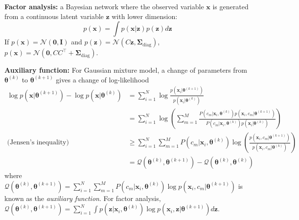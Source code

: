 \documentclass[12pt]{article}
\begin{document}
\textbf{Factor analysis:} a Bayesian network where the observed variable $\boldsymbol{x}$ is generated from a continuous latent variable $\boldsymbol{z}$ with lower dimension:
$$
p(\boldsymbol{x}) = \int p(\boldsymbol{x} | \boldsymbol{z}) p(\boldsymbol{z}) d\boldsymbol{z}
$$
If $p(\boldsymbol{x}) = \mathcal{N}(\mathbf{0}, \mathbf{I})$ and $p(\boldsymbol{z}) = \mathcal{N}(C\boldsymbol{z}, \boldsymbol{\Sigma}_\text{diag})$, $p(\boldsymbol{x}) = \mathcal{N}(\mathbf{0}, CC^\top + \boldsymbol{\Sigma}_\text{diag})$.

\textbf{Auxiliary function:} For Gaussian mixture model, a change of parameters from $\boldsymbol{\theta}^{(k)}$ to $\boldsymbol{\theta}^{(k+1)}$ gives a change of log-likelihood
\begin{align*}
\log p(\boldsymbol{x} | \boldsymbol{\theta}^{(k+1)}) - \log p(\boldsymbol{x} | \boldsymbol{\theta}^{(k)}) &= \sum_{i=1}^N \log \frac{p(\boldsymbol{x}_i | \boldsymbol{\theta}^{(k+1)})}{p(\boldsymbol{x}_i | \boldsymbol{\theta}^{(k)})} \\
&= \sum_{i=1}^N \log \left( \sum_{m=1}^M \frac{P(c_m | \boldsymbol{x}_i, \boldsymbol{\theta}^{(k)}) p(\boldsymbol{x}_i , c_m | \boldsymbol{\theta}^{(k+1)})}{P(c_m | \boldsymbol{x}_i, \boldsymbol{\theta}^{(k)})p(\boldsymbol{x}_i | \boldsymbol{\theta}^{(k)})}\right) \\
\text{(Jensen's inequality) } &\geq \sum_{i=1}^N \sum_{m=1}^M P(c_m | \boldsymbol{x}_i, \boldsymbol{\theta}^{(k)}) \log \left(\frac{p(\boldsymbol{x}_i , c_m | \boldsymbol{\theta}^{(k+1)})}{p(\boldsymbol{x}_i , c_m | \boldsymbol{\theta}^{(k)})}\right) \\
&= \mathcal{Q}(\boldsymbol{\theta}^{(k)}, \boldsymbol{\theta}^{(k+1)}) - \mathcal{Q}(\boldsymbol{\theta}^{(k)}, \boldsymbol{\theta}^{(k)})
\end{align*}
where $\mathcal{Q}(\boldsymbol{\theta}^{(k)}, \boldsymbol{\theta}^{(k+1)}) = \sum_{i=1}^N \sum_{m=1}^M P(c_m | \boldsymbol{x}_i, \boldsymbol{\theta}^{(k)}) \log p(\boldsymbol{x}_i , c_m | \boldsymbol{\theta}^{(k+1)})$ is known as the \textit{auxiliary function}. 
For factor analysis, $\mathcal{Q}(\boldsymbol{\theta}^{(k)}, \boldsymbol{\theta}^{(k+1)}) = \sum_{i=1}^N \int p(\boldsymbol{z} | \boldsymbol{x}_i, \boldsymbol{\theta}^{(k)}) \log p(\boldsymbol{x}_i, \boldsymbol{z} | \boldsymbol{\theta}^{(k+1)}) d\boldsymbol{z}$.
\end{document}
